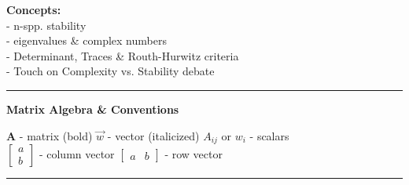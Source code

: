 \documentclass{article}
\newcommand{\ind}{\-\hspace{1cm}}
\begin{document}
\noindent{}

\textbf{Concepts:}\\
\ind - n-spp. stability\\
\ind - eigenvalues \& complex numbers\\
\ind - Determinant, Traces \& Routh-Hurwitz criteria\\
\ind - Touch on Complexity vs. Stability debate

\rule[0.5ex]{\linewidth}{1pt}

\textbf{Matrix Algebra \& Conventions}
\begin{center}
\textbf{A} - matrix (bold) \ind \ind $\vec w$ - vector (italicized) \ind \ind $A_{ij}$ or $w_i$ - scalars\\
$\begin{bmatrix} a\\ b \end{bmatrix}$ - column vector \ind \ind $\begin{bmatrix} a & b \end{bmatrix}$ - row vector
\end{center}

\rule[0.5ex]{\linewidth}{1pt}
\end{document}
